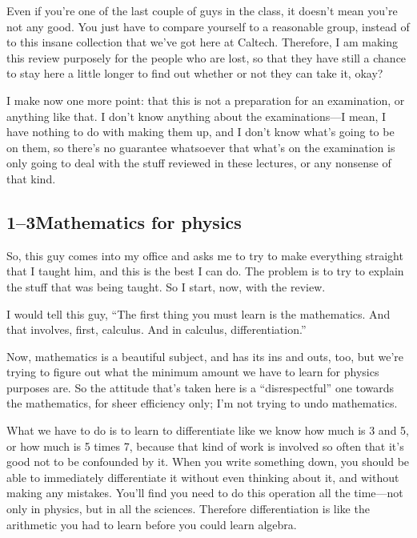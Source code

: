\documentclass[11pt,oneside]{article}
\begin{document}
Even if you're one of the last couple of guys in the class, it doesn't mean you're not any good. You just have to compare yourself to a reasonable group, instead of to this insane collection that we've got here at Caltech. Therefore, I am making this review purposely for the people who are lost, so that they have still a chance to stay here a little longer to find out whether or not they can take it, okay?\par

I make now one more point: that this is not a preparation for an examination, or anything like that. I don't know anything about the examinations---I mean, I have nothing to do with making them up, and I don't know what's going to be on them, so there's no guarantee whatsoever that what's on the examination is only going to deal with the stuff reviewed in these lectures, or any nonsense of that kind.\par

\subsection*{1--3Mathematics for physics}

So, this guy comes into my office and asks me to try to make everything straight that I taught him, and this is the best I can do. The problem is to try to explain the stuff that was being taught. So I start, now, with the review.\par

I would tell this guy, ``The first thing you must learn is the mathematics. And that involves, first, calculus. And in calculus, differentiation.''\par

Now, mathematics is a beautiful subject, and has its ins and outs, too, but we're trying to figure out what the minimum amount we have to learn for physics purposes are. So the attitude that's taken here is a ``disrespectful'' one towards the mathematics, for sheer efficiency only; I'm not trying to undo mathematics.\par

What we have to do is to learn to differentiate like we know how much is 3 and 5, or how much is 5 times 7, because that kind of work is involved so often that it's good not to be confounded by it. When you write something down, you should be able to immediately differentiate it without even thinking about it, and without making any mistakes. You'll find you need to do this operation all the time---not only in physics, but in all the sciences. Therefore differentiation is like the arithmetic you had to learn before you could learn algebra.\par
\end{document}

